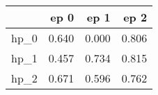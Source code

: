 \begin{tabular}{lrrr}
\toprule
{} &   ep 0 &   ep 1 &   ep 2 \\
\midrule
hp\_0 &  0.640 &  0.000 &  0.806 \\
hp\_1 &  0.457 &  0.734 &  0.815 \\
hp\_2 &  0.671 &  0.596 &  0.762 \\
\bottomrule
\end{tabular}

